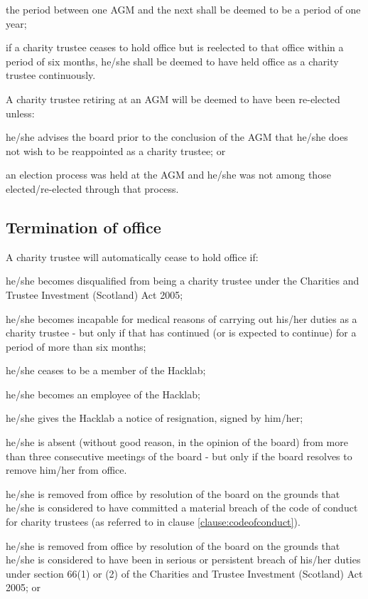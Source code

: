 \documentclass{article}
\newcommand{\charityact}{Charities and Trustee Investment (Scotland) Act 2005}
\begin{document}
\subclause the period between one AGM and the next shall be deemed to
be a period of one year;

\subclause if a charity trustee ceases to hold office but is
reelected to that office within a period of six months, he/she shall
be deemed to have held office as a charity trustee continuously.

\clause A charity trustee retiring at an AGM will be deemed to have
been re-elected unless:

\subclause he/she advises the board prior to the conclusion of the AGM
that he/she does not wish to be reappointed as a charity trustee; or

\subclause an election process was held at the AGM and he/she was not
among those elected/re-elected through that process.

\subsection{Termination of office}

\clause A charity trustee will automatically cease to hold office if:

\subclause he/she becomes disqualified from being a charity trustee
under the \charityact;

\subclause he/she becomes incapable for medical reasons of carrying
out his/her duties as a charity trustee - but only if that has
continued (or is expected to continue) for a period of more than six
months;

\subclause he/she ceases to be a member of the Hacklab;

\subclause he/she becomes an employee of the Hacklab;

\subclause he/she gives the Hacklab a notice of resignation, signed by
him/her;

\subclause he/she is absent (without good reason, in the opinion of
the board) from more than three consecutive meetings of the board -
but only if the board resolves to remove him/her from office.

\subclause\label{clause:materialbreach}he/she is removed from office by resolution of the board on
the grounds that he/she is considered to have committed a material
breach of the code of conduct for charity trustees (as referred to in
clause \ref{clause:codeofconduct}).

\subclause\label{clause:charityactbreach}he/she is removed from office
by resolution of the board on the grounds that he/she is considered to
have been in serious or persistent breach of his/her duties under
section 66(1) or (2) of the \charityact; or
\end{document}
